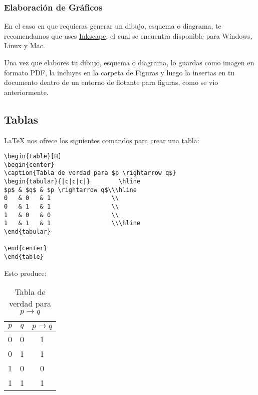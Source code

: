 \subsubsection{Elaboración de Gráficos}

En el caso en que requieras generar un dibujo, esquema o diagrama, te recomendamos que uses \href{https://inkscape.org}{Inkscape}, el cual se encuentra disponible para Windows, Linux y Mac. 

Una vez que elabores tu dibujo, esquema o diagrama, lo guardas como imagen en formato PDF, la incluyes en la carpeta de Figuras y luego la insertas en tu documento dentro de un entorno de flotante para figuras, como se vio anteriormente.


\subsection{Tablas} 

\LaTeX{} nos ofrece los siguientes comandos para crear una tabla:

\begin{lstlisting}[frame=single]
\begin{table}[H] 
\begin{center}
\caption{Tabla de verdad para $p \rightarrow q$} 
\begin{tabular}{|c|c|c|}        \hline 
$p$ & $q$ & $p \rightarrow q$\\\hline 
0   & 0   & 1                 \\ 
0   & 1   & 1                 \\ 
1   & 0   & 0                 \\ 
1   & 1   & 1                 \\\hline 
\end{tabular} 

\end{center}
\end{table}
\end{lstlisting}


Esto produce:

\begin{table}[H] 
\begin{center}
\caption{Tabla de verdad para $p \rightarrow q$}
\begin{tabular}{|c|c|c|}        \hline 
$p$ & $q$ & $p \rightarrow q$\\\hline 
0   & 0   & 1                 \\ 
0   & 1   & 1                 \\ 
1   & 0   & 0                 \\ 
1   & 1   & 1                 \\\hline 
\end{tabular} 

\label{t}
\end{center}

\end{table}

